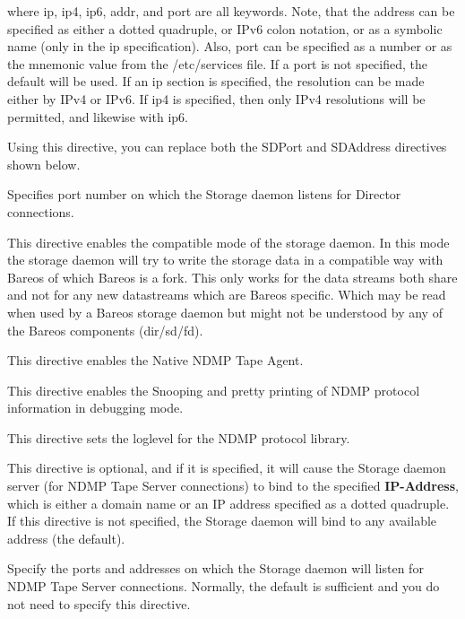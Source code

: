 \begin{description}
where ip, ip4, ip6, addr, and port are all keywords. Note, that  the address
can be specified as either a dotted quadruple, or  IPv6 colon notation, or as
a symbolic name (only in the ip specification).  Also, port can be specified
as a number or as the mnemonic value from  the /etc/services file.  If a port
is not specified, the default will be used. If an ip  section is specified,
the resolution can be made either by IPv4 or  IPv6. If ip4 is specified, then
only IPv4 resolutions will be permitted,  and likewise with ip6.

Using this directive, you can replace both the SDPort and SDAddress
directives shown below.

Specifies port number on which the Storage daemon  listens for Director
connections.

This directive enables the compatible mode of the storage daemon. In
this mode the storage daemon will try to write the storage data in a
compatible way with Bareos of which Bareos is a fork. This only works
for the data streams both share and not for any new datastreams which
are Bareos specific. Which may be read when used by a Bareos storage
daemon but might not be understood by any of the Bareos components
(dir/sd/fd).

This directive enables the Native NDMP Tape Agent.

This directive enables the Snooping and pretty printing of NDMP protocol
information in debugging mode.

This directive sets the loglevel for the NDMP protocol library.

This directive is optional, and if it is specified, it will cause the
Storage daemon server (for NDMP Tape Server connections) to bind
to the specified {\bf IP-Address}, which is either a domain name or an
IP address specified as a dotted quadruple.  If this directive is not
specified, the Storage daemon will bind to any available address (the
default).

Specify the ports and addresses on which the Storage daemon will listen
for NDMP Tape Server connections.  Normally, the default is sufficient and you
do not need to specify this directive.


\end{description}
